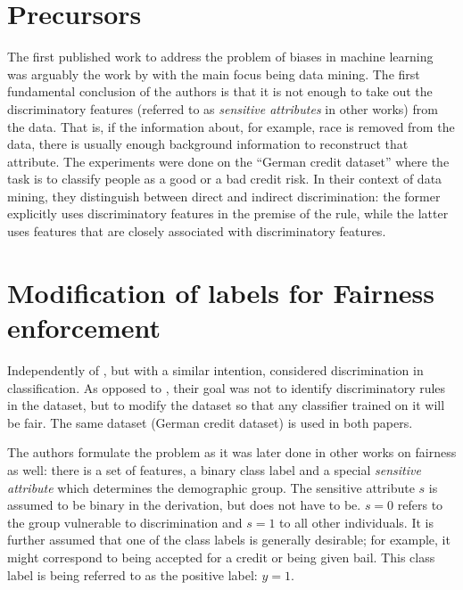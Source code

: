 \section{Precursors}\label{precursor}
The first published work to address the problem of biases in machine learning
was arguably the work by \citet{pedreshi2008discrimination}
with the main focus being data mining.
The first fundamental conclusion of the authors
is that it is not enough to take out the discriminatory features
(referred to as \emph{sensitive attributes} in other works) from the data.
That is, if the information about, for example, race
is removed from the data,
there is usually enough background information to reconstruct that attribute.
The experiments were done on the ``German credit dataset''
where the task is to classify people as a good or a bad credit risk.
In their context of data mining,
they distinguish between direct and indirect discrimination:
the former explicitly uses discriminatory features in the premise of the rule,
while the latter uses features that are closely associated with discriminatory features.

\section{Modification of labels for Fairness enforcement}\label{modification-of-labels-for-fairness-enforcement}
Independently of \citet{pedreshi2008discrimination}, but with a similar intention,
\citet{kamiran2009classifying} considered discrimination in classification.
As opposed to \citet{pedreshi2008discrimination}, their goal was not to identify discriminatory rules in the dataset,
but to modify the dataset so that any classifier trained on it will be fair.
The same dataset (German credit dataset) is used in both papers.

The authors formulate the problem as it was later done in other works on fairness as well:
there is a set of features, a binary class label
and a special \emph{sensitive attribute} which determines the demographic group.
The sensitive attribute \(s\) is assumed to be binary in the derivation,
but does not have to be.
\(s=0\) refers to the group vulnerable to discrimination and \(s=1\) to all other individuals.
It is further assumed that one of the class labels is generally desirable;
for example, it might correspond to being accepted for a credit or being given bail.
This class label is being referred to as the positive label: \(y = 1\).

